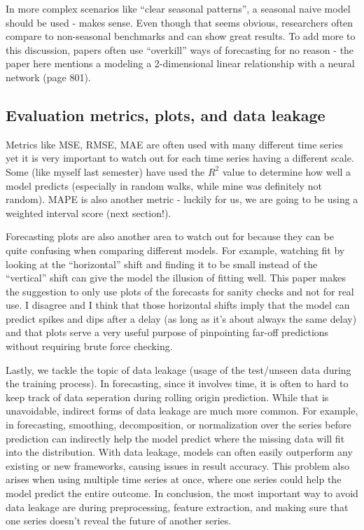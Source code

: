 \documentclass[12pt]{article}
\begin{document}
In more complex scenarios like ``clear seasonal patterns'', a seasonal naive model should be used - makes sense. Even though that seems obvious, researchers often compare to non-seasonal benchmarks and can show great results. To add more to this discussion, papers often use ``overkill'' ways of forecasting for no reason - the paper here mentions a modeling a 2-dimensional linear relationship with a neural network (page 801). 

\subsection{Evaluation metrics, plots, and data leakage}
Metrics like MSE, RMSE, MAE are often used with many different time series yet it is very important to watch out for each time series having a different scale. Some (like myself last semester) have used the $R^2$ value to determine how well a model predicts (especially in random walks, while mine was definitely not random). MAPE is also another metric - luckily for us, we are going to be using a weighted interval score (next section!). 

Forecasting plots are also another area to watch out for because they can be quite confusing when comparing different models. For example, watching fit by looking at the ``horizontal'' shift and finding it to be small instead of the ``vertical'' shift can give the model the illusion of fitting well. This paper makes the suggestion to only use plots of the forecasts for sanity checks and not for real use. I disagree and I think that those horizontal shifts imply that the model can predict spikes and dips after a delay (as long as it's about always the same delay) and that plots serve a very useful purpose of pinpointing far-off predictions without requiring brute force checking.

Lastly, we tackle the topic of data leakage (usage of the test/unseen data during the training process). In forecasting, since it involves time, it is often to hard to keep track of data seperation during rolling origin prediction. While that is unavoidable, indirect forms of data leakage are much more common. For example, in forecasting, smoothing, decomposition, or normalization over the series before prediction can indirectly help the model predict where the missing data will fit into the distribution. With data leakage, models can often easily outperform any existing or new frameworks, causing issues in result accuracy. This problem also arises when using multiple time series at once, where one series could help the model predict the entire outcome. In conclusion, the most important way to avoid data leakage are during preprocessing, feature extraction, and making sure that one series doesn't reveal the future of another series.
\end{document}
